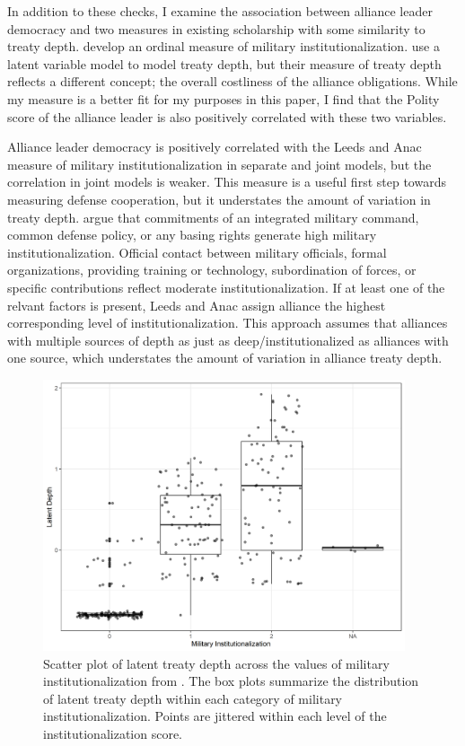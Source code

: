 \documentclass[12pt]{article}
\begin{document}
In addition to these checks, I examine the association between alliance leader democracy and two measures in existing scholarship with some similarity to treaty depth. 
\citet{LeedsAnac2005} develop an ordinal measure of military institutionalization.
\citet{BensonClinton2016} use a latent variable model to model treaty depth, but their measure of treaty depth reflects a different concept; the overall costliness of the alliance obligations. 
While my measure is a better fit for my purposes in this paper, I find that the Polity score of the alliance leader is also positively correlated with these two variables. 


Alliance leader democracy is positively correlated with the Leeds and Anac measure of military institutionalization in separate and joint models, but the correlation in joint models is weaker.
This measure is a useful first step towards measuring defense cooperation, but it understates the amount of variation in treaty depth. 
\citet{LeedsAnac2005} argue that commitments of an integrated military command, common defense policy, or any basing rights generate high military institutionalization. 
Official contact between military officials, formal organizations, providing training or technology, subordination of forces, or specific contributions reflect moderate institutionalization. 
If at least one of the relvant factors is present, Leeds and Anac assign alliance the highest corresponding level of institutionalization. 
This approach assumes that alliances with multiple sources of depth as just as deep/institutionalized as alliances with one source, which understates the amount of variation in alliance treaty depth.


\begin{figure}[htbp]
	\centering
		\includegraphics[width=0.95\textwidth]{milinst-comp.png}
	\caption{Scatter plot of latent treaty depth across the values of military institutionalization from \citet{LeedsAnac2005}. The box plots summarize the distribution of latent treaty depth within each category of military institutionalization. Points are jittered within each level of the institutionalization score.}
	\label{fig:milinst-comp}
\end{figure} 
\end{document}
